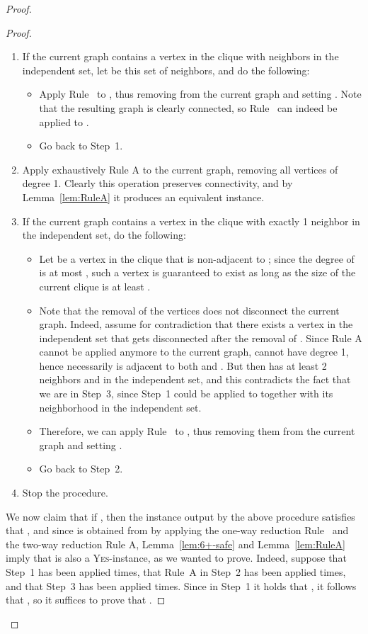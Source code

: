 \documentclass[
final
]{dmtcs-episciences}
\begin{document}
\begin{proof}
\begin{proof}
\begin{enumerate}
\item If the current graph contains a vertex  in the clique with  neighbors in the independent set, let  be this set of neighbors, and do the following:
    \begin{itemize}
\item[] Apply Rule~ to , thus removing  from the current graph and setting . Note that the resulting graph is clearly connected, so Rule~ can indeed be applied to .
     \item[] Go back to Step~1.
    \end{itemize}
\item Apply exhaustively Rule A to the current graph, removing all vertices of degree 1. Clearly this operation preserves connectivity, and by Lemma~\ref{lem:RuleA} it produces an equivalent instance.
\item If the current graph contains a vertex  in the clique with exactly 1 neighbor  in the independent set, do the following:
    \begin{itemize}
    \item[] Let  be a vertex in the clique that is non-adjacent to ; since the degree of  is at most , such a vertex  is guaranteed to exist as long as the size of the current clique is at least .
    \item[] Note that the removal of the vertices  does not disconnect the current graph. Indeed, assume for contradiction that there exists a vertex  in the independent set that gets disconnected after the removal of . Since Rule A cannot be applied anymore to the current graph,  cannot have degree 1, hence necessarily  is adjacent to both  and . But then  has at least 2 neighbors  and  in the independent set, and this contradicts the fact that we are in Step~3, since Step~1 could be applied to  together with its neighborhood in the independent set.
     \item[] Therefore, we can apply Rule~ to  , thus removing them from the current graph and setting .
    \item[] Go back to Step~2.
    \end{itemize}
 \item Stop the procedure.
\end{enumerate}



\noindent We now claim that if , then the instance  output by the above procedure satisfies that , and since  is obtained from  by applying the one-way reduction Rule~ and the two-way reduction Rule A, Lemma~\ref{lem:6+-safe} and Lemma~\ref{lem:RuleA} imply that   is also a \textsc{Yes}-instance, as we wanted to prove. Indeed, suppose that Step~1 has been applied  times, that Rule~A in Step~2 has been applied  times, and that Step~3 has been applied  times. Since in Step~1 it holds that , it follows that , so it suffices to prove that .


\end{proof}
\end{proof}
\end{document}
